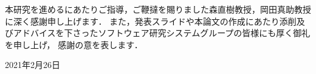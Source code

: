 \newpage
\changeindent{0cm}
\acknowledgements
\changeindent{2cm}

本研究を進めるにあたりご指導，ご鞭撻を賜りました森直樹教授，岡田真助教授に深く感謝申し上げます．
また，発表スライドや本論文の作成にあたり添削及びアドバイスを下さったソフトウェア研究システムグループの皆様にも厚く御礼を申し上げ，
感謝の意を表します．
\begin{flushright}
	2021年2月26日
\end{flushright}
